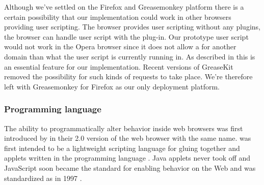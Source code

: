 Although we've settled on the Firefox and Greasemonkey platform there is a
certain possibility that our implementation could work in other browsers
providing user scripting. The  browser provides user scripting
without any plugins,%
the  browser can handle user script with the
%
plug-in. Our prototype user script would not work in the Opera browser since
it does not allow a  for another domain than what the
user script is currently running in. As described in
this is an essential feature for our implementation. Recent versions of
GreaseKit removed the possibility for such kinds of requests to take place.
We're therefore left with Greasemonkey for Firefox as our only deployment
platform.

\subsubsection{Programming language}
\label{section:selection.stack.client.language}

The ability to programmatically alter behavior inside web browsers was first
introduced by  in their 2.0 version of the web browser
with the same name.  was first intended to be a
lightweight scripting language for gluing together  and applets
written in the  programming language \citep{netscape95}.%
Java applets never took off and JavaScript soon became the 
standard for enabling behavior on the Web and was standardized as
 in 1997 \citep{ecma99}.

